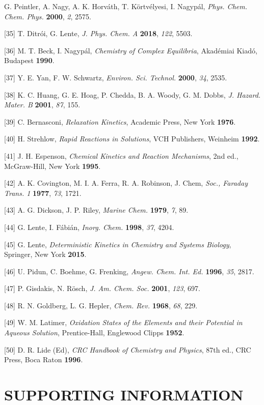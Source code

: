 \documentclass{article}
\begin{document}
\begin{hangpars}
[34] G. Peintler, A. Nagy, A. K. Horváth, T. Körtvélyesi, I. Nagypál, \emph{Phys. Chem. Chem. Phys.} \textbf{2000}, \emph{2}, 2575.

[35] T. Ditrói, G. Lente, \emph{J. Phys. Chem. A} \textbf{2018}, \emph{122}, 5503.

[36] M. T. Beck, I. Nagypál, \emph{Chemistry of Complex Equilibria}, Akadémiai Kiadó, Budapest \textbf{1990}.

[37] Y. E. Yan, F. W. Schwartz, \emph{Environ. Sci. Technol.} \textbf{2000}, \emph{34}, 2535.

[38] K. C. Huang, G. E. Hoag, P. Chedda, B. A. Woody, G. M. Dobbs, \emph{J. Hazard. Mater. B} \textbf{2001}, \emph{87}, 155.

[39] C. Bernasconi, \emph{Relaxation Kinetics}, Academic Press, New York \textbf{1976}.

[40] H. Strehlow, \emph{Rapid Reactions in Solutions}, VCH Publishers, Weinheim \textbf{1992}.

[41] J. H. Espenson, \emph{Chemical Kinetics and Reaction Mechanisms}, 2nd ed., McGraw-Hill, New York \textbf{1995}.

[42] A. K. Covington, M. I. A. Ferra, R. A. Robinson, J. Chem, \emph{Soc., Faraday Trans. 1} \textbf{1977}, \emph{73}, 1721.

[43] A. G. Dickson, J. P. Riley, \emph{Marine Chem.} \textbf{1979}, \emph{7}, 89.

[44] G. Lente, I. Fábián, \emph{Inorg. Chem.} \textbf{1998}, \emph{37}, 4204.

[45] G. Lente, \emph{Deterministic Kinetics in Chemistry and Systems Biology}, Springer, New York \textbf{2015}.

[46] U. Pidun, C. Boehme, G. Frenking, \emph{Angew. Chem. Int. Ed.} \textbf{1996}, \emph{35}, 2817.

[47] P. Gisdakis, N. Rösch, \emph{J. Am. Chem. Soc.} \textbf{2001}, \emph{123}, 697.

[48] R. N. Goldberg, L. G. Hepler, \emph{Chem. Rev.} \textbf{1968}, \emph{68}, 229.

[49] W. M. Latimer, \emph{Oxidation States of the Elements and their Potential in Aqueous Solution}, Prentice-Hall, Englewood Clipps \textbf{1952}.

[50] D. R. Lide (Ed), \emph{CRC Handbook of Chemistry and Physics}, 87th ed., CRC Press, Boca Raton \textbf{1996}.
\end{hangpars}

\section*{SUPPORTING INFORMATION}
\end{document}
